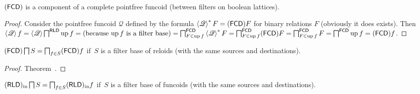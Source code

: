 \begin{thm}
  $(\mathsf{FCD})$ is a component of a complete pointfree funcoid
  (between filters on boolean lattices).
\end{thm}

\begin{proof}
  Consider the pointfree funcoid $\mathscr{Q}$ defined by the formula
  $\left\langle \mathscr{Q} \right\rangle^{\ast} F = (\mathsf{FCD}) F$
  for binary relations $F$ (obviously it does exists). Then $\left\langle
  \mathscr{Q} \right\rangle f = \left\langle \mathscr{Q} \right\rangle
  \bigsqcap^{\mathsf{RLD}} \operatorname{up} f = \text{(because $\operatorname{up} f$
  is a filter base)} = \bigsqcap^{\mathsf{FCD}}_{F \in \operatorname{up} f}
  \left\langle \mathscr{Q} \right\rangle^{\ast} F =
  \bigsqcap^{\mathsf{FCD}}_{F \in \operatorname{up} f} (\mathsf{FCD}) F
  = \bigsqcap^{\mathsf{FCD}}_{F \in \operatorname{up} f} F =
  \bigsqcap^{\mathsf{FCD}} \operatorname{up} f = (\mathsf{FCD}) f$.
\end{proof}

\begin{prop}
$(\mathsf{FCD}) \bigsqcap S = \bigsqcap_{f\in S}(\mathsf{FCD}) f$ if~$S$ is
a filter base of reloids (with the same sources and destinations).
\end{prop}

\begin{proof}
Theorem~.
\end{proof}

\begin{conjecture}
$(\mathsf{RLD})_{\mathrm{in}} \bigsqcap S = \bigsqcap_{f\in S}(\mathsf{RLD})_{\mathrm{in}} f$ if~$S$ is
a filter base of funcoids (with the same sources and destinations).
\end{conjecture}
